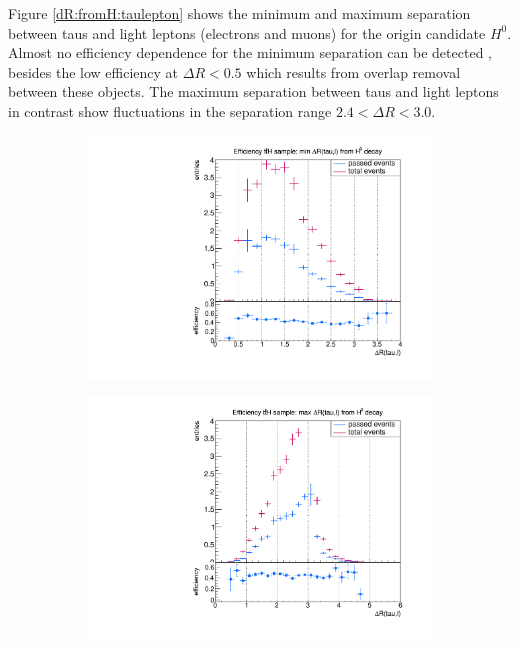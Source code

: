 Figure \ref{dR:fromH:taulepton} shows the minimum and maximum separation between taus and light leptons (electrons and muons) for the origin candidate $H^0$. Almost no efficiency dependence for the minimum separation can be detected , besides the low efficiency at $\Delta R<0.5$ which results from overlap removal between these objects. The maximum separation between taus and light leptons in contrast show fluctuations in the separation range $2.4<\Delta R<3.0$. \newline
%
\begin{figure}
  \centering
                \begin{subfigure}[t]{0.49\textwidth}
                \includegraphics[width=\textwidth]{figures/plots/ttH/Divided_fromH_mindR_taulepton.pdf}
                \label{dR:fromH:taulepton:min}
                \end{subfigure}
                \begin{subfigure}[t]{0.49\textwidth}
                \includegraphics[width=\textwidth]{figures/plots/ttH/Divided_maxdR_fromH_taulepton.pdf}

\end{subfigure}
\end{figure}
